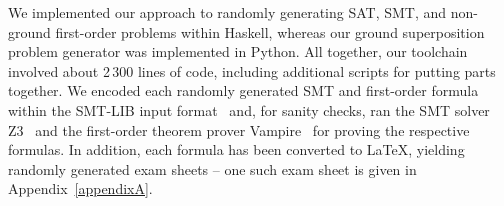 We implemented our approach to randomly generating
SAT, SMT, and non-ground first-order problems within Haskell, whereas
our ground superposition problem generator was implemented in
Python. All together, our toolchain involved about 2\,300 lines of code,
including additional scripts for putting parts together.
We encoded each randomly generated SMT and first-order formula within
the SMT-LIB input format~\cite{barrett2017smtlib} and, for sanity checks, ran the SMT
solver Z3~\cite{Z3}  and the first-order theorem prover
Vampire~\cite{Vampire13} for proving the respective formulas.
In addition, each formula has been converted  to \LaTeX{}, yielding
randomly generated exam sheets -- one such exam sheet is given in
Appendix~\ref{appendixA}. 

%
%
%
%
